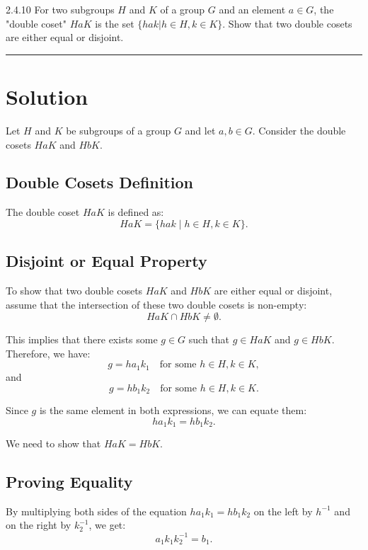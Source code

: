 \documentclass[12pt]{amsart}
\theoremstyle{definition}
\numberwithin{equation}{section}
\begin{document}
\begin{exercise}{2.4.10} For two subgroups $H$ and $K$ of a group $G$ and an element \(a\in G\), the "double coset" \(HaK\) is the set \(\{hak | h\in H, k\in K\}\). Show that two double cosets are either equal or disjoint.

    \noindent\rule{\linewidth}{1pt}

    \section*{Solution}

    Let \(H\) and \(K\) be subgroups of a group \(G\) and let \(a, b \in G\). Consider the double cosets \(HaK\) and \(HbK\).

    \subsection*{Double Cosets Definition}

    The double coset \(HaK\) is defined as:
    \[
    HaK = \{hak \mid h \in H, k \in K\}.
    \]

    \subsection*{Disjoint or Equal Property}

    To show that two double cosets \(HaK\) and \(HbK\) are either equal or disjoint, assume that the intersection of these two double cosets is non-empty:
    \[
    HaK \cap HbK \neq \emptyset.
    \]

    This implies that there exists some \(g \in G\) such that \(g \in HaK\) and \(g \in HbK\). Therefore, we have:
    \[
    g = ha_1k_1 \quad \text{for some } h \in H, k \in K,
    \]
    and
    \[
    g = hb_1k_2 \quad \text{for some } h \in H, k \in K.
    \]

    Since \(g\) is the same element in both expressions, we can equate them:
    \[
    ha_1k_1 = hb_1k_2.
    \]

    We need to show that \(HaK = HbK\).

    \subsection*{Proving Equality}

    By multiplying both sides of the equation \(ha_1k_1 = hb_1k_2\) on the left by \(h^{-1}\) and on the right by \(k_2^{-1}\), we get:
    \[
    a_1k_1k_2^{-1} = b_1.
    \]


\end{exercise}
\end{document}
